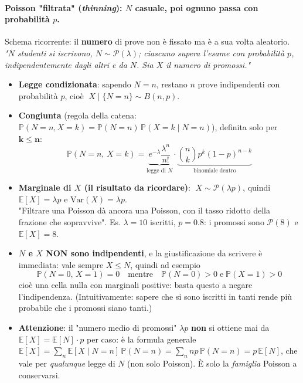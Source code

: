 \documentclass[12pt]{extarticle} %
\begin{document}
\paragraph{Poisson "filtrata" (\emph{thinning}): $N$ casuale, poi ognuno passa con probabilità $p$.} Schema ricorrente: il \textbf{numero} di prove non è fissato ma è a sua volta aleatorio. \\
\emph{"$N$ studenti si iscrivono, $N \sim \mathcal{P}(\lambda)$; ciascuno supera l'esame con probabilità $p$, indipendentemente dagli altri e da $N$. Sia $X$ il numero di promossi."}
\begin{itemize}
    \item \textbf{Legge condizionata}: sapendo $N = n$, restano $n$ prove indipendenti con probabilità $p$, cioè $\;X \mid \{N = n\} \sim B(n, p)$.
    \item \textbf{Congiunta} (regola della catena: $\mathbb{P}(N=n, X=k) = \mathbb{P}(N=n)\,\mathbb{P}(X=k \mid N=n)$), definita solo per $\mathbf{k \le n}$:
    $$ \mathbb{P}(N = n,\, X = k) = \underbrace{e^{-\lambda}\frac{\lambda^n}{n!}}_{\text{legge di } N} \cdot \underbrace{\binom{n}{k} p^k (1-p)^{n-k}}_{\text{binomiale dentro}} $$
    \item \textbf{Marginale di $X$ (il risultato da ricordare)}: $\;\boxed{X \sim \mathcal{P}(\lambda p)}$, \; quindi $\mathbb{E}[X] = \lambda p$ e $\mathrm{Var}(X) = \lambda p$. \\ {\footnotesize "Filtrare una Poisson dà ancora una Poisson, con il tasso ridotto della frazione che sopravvive". Es. $\lambda = 10$ iscritti, $p = 0.8$: i promossi sono $\mathcal{P}(8)$ e $\mathbb{E}[X] = 8$.}
    \item \textbf{$N$ e $X$ NON sono indipendenti}, e la giustificazione da scrivere è immediata: vale sempre $X \le N$, quindi ad esempio
    $$ \mathbb{P}(N = 0,\, X = 1) = 0 \quad\text{mentre}\quad \mathbb{P}(N=0) > 0 \;\text{e}\; \mathbb{P}(X=1) > 0 $$
    cioè una cella nulla con marginali positive: basta questo a negare l'indipendenza. {\footnotesize (Intuitivamente: sapere che si sono iscritti in tanti rende più probabile che i promossi siano tanti.)}
    \item \textbf{Attenzione}: il "numero medio di promossi" $\lambda p$ \textbf{non} si ottiene mai da $\mathbb{E}[X] = \mathbb{E}[N]\cdot p$ per caso: è la formula generale $\mathbb{E}[X] = \sum_n \mathbb{E}[X \mid N=n]\,\mathbb{P}(N=n) = \sum_n np\,\mathbb{P}(N=n) = p\,\mathbb{E}[N]$, che vale per \emph{qualunque} legge di $N$ (non solo Poisson). È solo la \emph{famiglia} Poisson a conservarsi.
\end{itemize}
\end{document}
